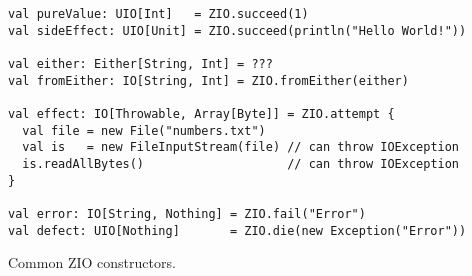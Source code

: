 \begin{algorithm}

\begin{verbatim}
val pureValue: UIO[Int]   = ZIO.succeed(1)
val sideEffect: UIO[Unit] = ZIO.succeed(println("Hello World!"))

val either: Either[String, Int] = ???
val fromEither: IO[String, Int] = ZIO.fromEither(either)

val effect: IO[Throwable, Array[Byte]] = ZIO.attempt {
  val file = new File("numbers.txt")
  val is   = new FileInputStream(file) // can throw IOException
  is.readAllBytes()                    // can throw IOException
}

val error: IO[String, Nothing] = ZIO.fail("Error")
val defect: UIO[Nothing]       = ZIO.die(new Exception("Error"))
\end{verbatim}

\caption{Common ZIO constructors. \label{zio:constructors}}
\end{algorithm}